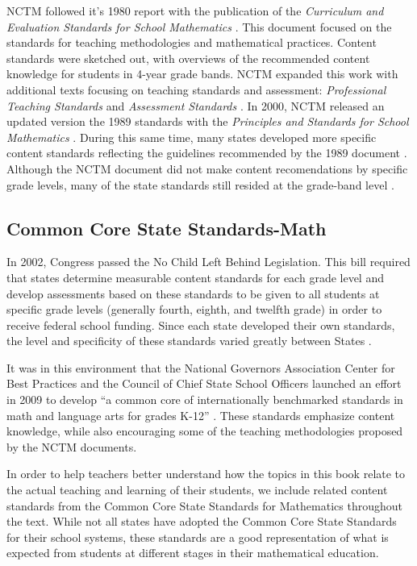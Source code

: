 \documentclass[
]{book}
\theoremstyle{definition}
\theoremstyle{definition}
\theoremstyle{definition}
\theoremstyle{remark}
\begin{document}
NCTM followed it's 1980 report with the publication of the \emph{Curriculum and Evaluation Standards for School Mathematics} \citep{NCTM1989}. This document focused on the standards for teaching methodologies and mathematical practices. Content standards were sketched out, with overviews of the recommended content knowledge for students in 4-year grade bands. NCTM expanded this work with additional texts focusing on teaching standards and assessment: \emph{Professional Teaching Standards} \citeyearpar{NCTM1991} and \emph{Assessment Standards} \citeyearpar{NCTM1995}. In 2000, NCTM released an updated version the 1989 standards with the \emph{Principles and Standards for School Mathematics} \citep{PSSM}. During this same time, many states developed more specific content standards reflecting the guidelines recommended by the 1989 document \citep{Raimi1998}. Although the NCTM document did not make content recomendations by specific grade levels, many of the state standards still resided at the grade-band level \citep[p.~677]{Reys2007}.

\hypertarget{common-core-state-standards-math}{%
\subsection{Common Core State Standards-Math}\label{common-core-state-standards-math}}

In 2002, Congress passed the No Child Left Behind Legislation. This bill required that states determine measurable content standards for each grade level and develop assessments based on these standards to be given to all students at specific grade levels (generally fourth, eighth, and twelfth grade) in order to receive federal school funding. Since each state developed their own standards, the level and specificity of these standards varied greatly between States \citep{Reys2007}.

It was in this environment that the National Governors Association Center for Best Practices and the Council of Chief State School Officers launched an effort in 2009 to develop ``a common core of internationally benchmarked standards in math and language arts for grades K-12'' \citep{CCSS}. These standards emphasize content knowledge, while also encouraging some of the teaching methodologies proposed by the NCTM documents.

In order to help teachers better understand how the topics in this book relate to the actual teaching and learning of their students, we include related content standards from the Common Core State Standards for Mathematics throughout the text. While not all states have adopted the Common Core State Standards for their school systems, these standards are a good representation of what is expected from students at different stages in their mathematical education.
\end{document}
